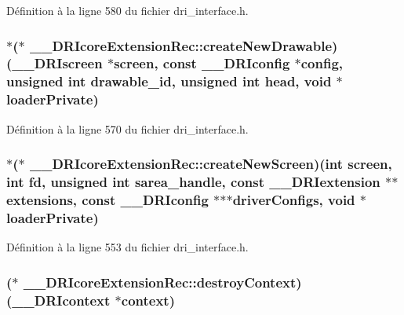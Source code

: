 Définition à la ligne 580 du fichier dri\-\_\-interface.\-h.

\hypertarget{struct_____d_r_icore_extension_rec_a9b214cbc2041b95158ba16b4dc663604}{
\subsubsection[{create\-New\-Drawable}]{$\ast$($\ast$ \-\_\-\-\_\-\-D\-R\-Icore\-Extension\-Rec\-::create\-New\-Drawable)({\bf \-\_\-\-\_\-\-D\-R\-Iscreen} $\ast$screen, const {\bf \-\_\-\-\_\-\-D\-R\-Iconfig} $\ast$config, unsigned int drawable\-\_\-id, unsigned int head, {\bf void} $\ast$loader\-Private)}}\label{struct_____d_r_icore_extension_rec_a9b214cbc2041b95158ba16b4dc663604}


Définition à la ligne 570 du fichier dri\-\_\-interface.\-h.

\hypertarget{struct_____d_r_icore_extension_rec_a03d777e65a01236f2fe86dcbe64947bc}{
\subsubsection[{create\-New\-Screen}]{$\ast$($\ast$ \-\_\-\-\_\-\-D\-R\-Icore\-Extension\-Rec\-::create\-New\-Screen)(int screen, int fd, unsigned int sarea\-\_\-handle, const {\bf \-\_\-\-\_\-\-D\-R\-Iextension} $\ast$$\ast$extensions, const {\bf \-\_\-\-\_\-\-D\-R\-Iconfig} $\ast$$\ast$$\ast$driver\-Configs, {\bf void} $\ast$loader\-Private)}}\label{struct_____d_r_icore_extension_rec_a03d777e65a01236f2fe86dcbe64947bc}


Définition à la ligne 553 du fichier dri\-\_\-interface.\-h.

\hypertarget{struct_____d_r_icore_extension_rec_a6f249e0f6b2476facdbef491c056d188}{
\subsubsection[{destroy\-Context}]{($\ast$ \-\_\-\-\_\-\-D\-R\-Icore\-Extension\-Rec\-::destroy\-Context)({\bf \-\_\-\-\_\-\-D\-R\-Icontext} $\ast$context)}}\label{struct_____d_r_icore_extension_rec_a6f249e0f6b2476facdbef491c056d188}


